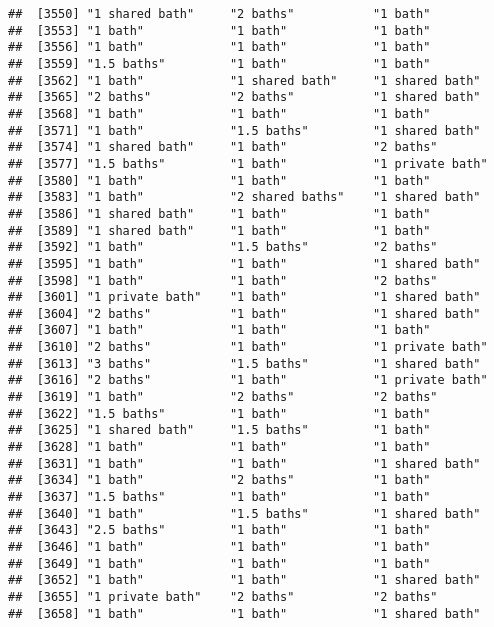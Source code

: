 \documentclass[
]{article}
\begin{document}
\begin{verbatim}
##  [3550] "1 shared bath"     "2 baths"           "1 bath"           
##  [3553] "1 bath"            "1 bath"            "1 bath"           
##  [3556] "1 bath"            "1 bath"            "1 bath"           
##  [3559] "1.5 baths"         "1 bath"            "1 bath"           
##  [3562] "1 bath"            "1 shared bath"     "1 shared bath"    
##  [3565] "2 baths"           "2 baths"           "1 shared bath"    
##  [3568] "1 bath"            "1 bath"            "1 bath"           
##  [3571] "1 bath"            "1.5 baths"         "1 shared bath"    
##  [3574] "1 shared bath"     "1 bath"            "2 baths"          
##  [3577] "1.5 baths"         "1 bath"            "1 private bath"   
##  [3580] "1 bath"            "1 bath"            "1 bath"           
##  [3583] "1 bath"            "2 shared baths"    "1 shared bath"    
##  [3586] "1 shared bath"     "1 bath"            "1 bath"           
##  [3589] "1 shared bath"     "1 bath"            "1 bath"           
##  [3592] "1 bath"            "1.5 baths"         "2 baths"          
##  [3595] "1 bath"            "1 bath"            "1 shared bath"    
##  [3598] "1 bath"            "1 bath"            "2 baths"          
##  [3601] "1 private bath"    "1 bath"            "1 shared bath"    
##  [3604] "2 baths"           "1 bath"            "1 shared bath"    
##  [3607] "1 bath"            "1 bath"            "1 bath"           
##  [3610] "2 baths"           "1 bath"            "1 private bath"   
##  [3613] "3 baths"           "1.5 baths"         "1 shared bath"    
##  [3616] "2 baths"           "1 bath"            "1 private bath"   
##  [3619] "1 bath"            "2 baths"           "2 baths"          
##  [3622] "1.5 baths"         "1 bath"            "1 bath"           
##  [3625] "1 shared bath"     "1.5 baths"         "1 bath"           
##  [3628] "1 bath"            "1 bath"            "1 bath"           
##  [3631] "1 bath"            "1 bath"            "1 shared bath"    
##  [3634] "1 bath"            "2 baths"           "1 bath"           
##  [3637] "1.5 baths"         "1 bath"            "1 bath"           
##  [3640] "1 bath"            "1.5 baths"         "1 shared bath"    
##  [3643] "2.5 baths"         "1 bath"            "1 bath"           
##  [3646] "1 bath"            "1 bath"            "1 bath"           
##  [3649] "1 bath"            "1 bath"            "1 bath"           
##  [3652] "1 bath"            "1 bath"            "1 shared bath"    
##  [3655] "1 private bath"    "2 baths"           "2 baths"          
##  [3658] "1 bath"            "1 bath"            "1 shared bath"    

\end{verbatim}
\end{document}

